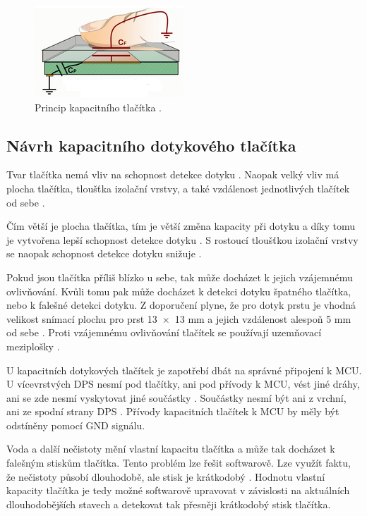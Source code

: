 \begin{figure}[!h]
  \begin{center}
    \includegraphics[scale=1]{obrazky/kapacitni_princip.png}
  \end{center}
  \caption[Princip kapacitního tlačítka]{Princip kapacitního tlačítka \cite{PrincipKapTl}.}
\end{figure}

\subsection{Návrh kapacitního dotykového tlačítka}
Tvar tlačítka nemá vliv na schopnost detekce dotyku \cite{PrincipKapTl}. Naopak velký vliv má plocha tlačítka, tloušťka
izolační vrstvy, a také vzdálenost jednotlivých tlačítek od sebe \cite{PrincipKapTl}. 

Čím větší je plocha tlačítka, tím je větší změna kapacity při dotyku a díky tomu je vytvořena lepší schopnost detekce 
dotyku \cite{PrincipKapTl}. S rostoucí tloušťkou izolační vrstvy se naopak schopnost detekce dotyku snižuje \cite{PrincipKapTl}.

Pokud jsou tlačítka příliš blízko u sebe, tak může docházet k jejich vzájemnému ovlivňování. Kvůli tomu pak může docházet k
detekci dotyku špatného tlačítka, nebo k falešné detekci dotyku. Z doporučení plyne, že pro dotyk prstu je vhodná velikost snímací 
plochu pro prst 13~$\times$~13 mm a jejich vzdálenost alespoň 5 mm od sebe \cite{PrincipKapTl}. Proti vzájemnému ovlivňování tlačítek
se používají uzemňovací meziplošky \cite{PrincipKapTl}. 

U kapacitních dotykových tlačítek je zapotřebí dbát na správné připojení k MCU. U vícevrstvých DPS nesmí pod tlačítky, ani pod přívody
k MCU, vést jiné dráhy, ani se zde nesmí vyskytovat jiné součástky \cite{PrincipKapTl}. Součástky nesmí být ani z vrchní, ani ze spodní 
strany DPS \cite{PrincipKapTl}. Přívody kapacitních tlačítek k MCU by měly být odstíněny pomocí GND signálu.

Voda a další nečistoty mění vlastní kapacitu tlačítka a může tak docházet k falešným stiskům tlačítka. Tento problém lze řešit softwarově. 
Lze využít faktu, že nečistoty působí dlouhodobě, ale stisk je krátkodobý \cite{PrincipKapTl}. Hodnotu vlastní kapacity tlačítka je tedy
možné softwarově upravovat v závislosti na aktuálních dlouhodobějších stavech a detekovat tak přesněji krátkodobý stisk tlačítka.

